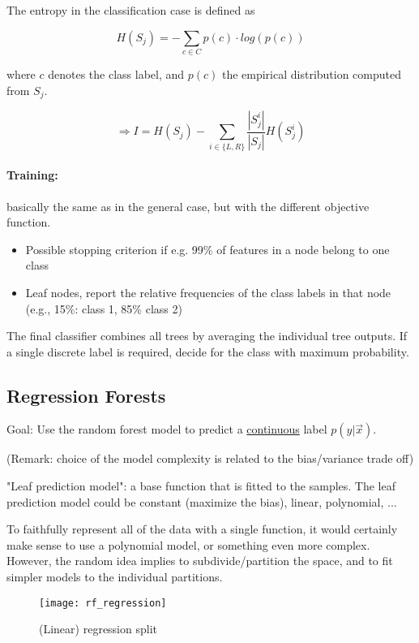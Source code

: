 The entropy in the classification case is defined as

\[H(S_j) = -\sum_{c \in C} p(c) \cdot log(p(c))\]

where \(c\) denotes the class label, and \(p(c)\) the empirical distribution computed from \(S_j\).

\[\Rightarrow I = H(S_j) - \sum_{i \in \{L,R\}} \frac{|S^i_j|}{|S_j|} H(S^i_j)\]

\paragraph{Training:} basically the same as in the general case, but with the different objective function.
\begin{itemize}
    \item Possible stopping criterion if e.g. 99\% of features in a node belong to one class
    \item Leaf nodes, report the relative frequencies of the class labels in that node (e.g., 15\%: class 1, 85\% class 2)
\end{itemize}

The final classifier combines all trees by averaging the individual tree outputs. If a single discrete label is required, decide for the class with maximum probability.


\newpage
\subsection*{Regression Forests}
Goal: Use the random forest model to predict a \underline{continuous} label \(p(y|\vec{x})\).

(Remark: choice of the model complexity is related to the bias/variance trade off)

"Leaf prediction model": a base function that is fitted to the samples. The leaf prediction model could be constant (maximize the bias), linear, polynomial, ...

To faithfully represent all of the data with a single function, it would certainly make sense to use a polynomial model, or something even more complex. However, the random idea implies to subdivide/partition the space, and to fit simpler models to the individual partitions.

\begin{figure}[H]
	\centering
  \texttt{[image: rf\_regression]}
	\caption{ (Linear) regression split}
\end{figure}

